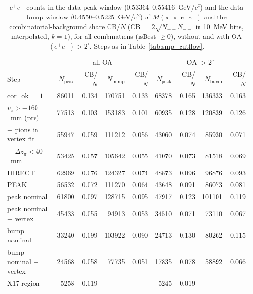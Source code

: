 \begin{table}[H]
\centering\footnotesize
\setlength{\tabcolsep}{3.5pt}
\caption{$e^+e^-$ counts in the data peak window (0.53364--0.55416~GeV/$c^2$) and the data bump window (0.4550--0.5225~GeV/$c^2$) of $M(\pi^+\pi^-e^+e^-)$ and the combinatorial-background share CB/$N$ (CB $=2\sqrt{N_{++}N_{--}}$ in 10~MeV bins, interpolated, $k=1$), for all combinations (isBest $\geq 0$), without and with OA$(e^+e^-)>2^\circ$. Steps as in Table~\ref{tab:smp_cutflow}.}
\label{tab:smp_cutflow_windows}
\begin{tabular}{l rr rr | rr rr}
\toprule
 & \multicolumn{4}{c|}{all OA} & \multicolumn{4}{c}{OA $>2^\circ$} \\
Step & $N_\mathrm{peak}$ & CB/$N$ & $N_\mathrm{bump}$ & CB/$N$ & $N_\mathrm{peak}$ & CB/$N$ & $N_\mathrm{bump}$ & CB/$N$ \\
\midrule
cor\_ok $=1$ & 86011 & 0.134 & 170751 & 0.133 & 68378 & 0.165 & 136333 & 0.163 \\
$v_z>-160$~mm (pre) & 77513 & 0.103 & 153183 & 0.101 & 60935 & 0.128 & 120839 & 0.126 \\
+ pions in vertex fit & 55947 & 0.059 & 111212 & 0.056 & 43060 & 0.074 & 85930 & 0.071 \\
+ $\Delta z_\pi<40$~mm & 53425 & 0.057 & 105642 & 0.055 & 41070 & 0.073 & 81518 & 0.069 \\
\midrule
DIRECT & 62969 & 0.076 & 124327 & 0.074 & 48873 & 0.096 & 96876 & 0.093 \\
PEAK & 56532 & 0.072 & 111270 & 0.064 & 43648 & 0.091 & 86073 & 0.081 \\
peak nominal & 61800 & 0.097 & 128715 & 0.095 & 47917 & 0.123 & 101101 & 0.119 \\
peak nominal + vertex & 45433 & 0.055 & 94913 & 0.053 & 34510 & 0.071 & 73110 & 0.067 \\
bump nominal & 33240 & 0.099 & 103922 & 0.090 & 24713 & 0.130 & 80262 & 0.115 \\
bump nominal + vertex & 24568 & 0.058 & 77735 & 0.051 & 17835 & 0.078 & 58892 & 0.066 \\
X17 region & 5258 & 0.019 & -- & -- & 5245 & 0.019 & -- & -- \\
\bottomrule
\end{tabular}
\end{table}
